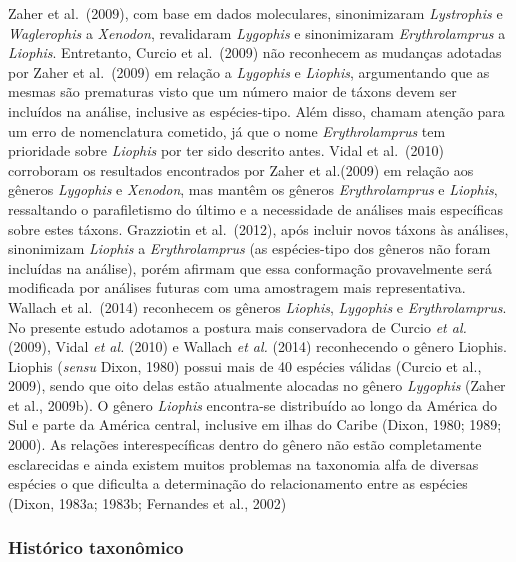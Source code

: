 \documentclass[
]{article}
\begin{document}
Zaher et al.~(2009), com base em dados moleculares, sinonimizaram
\emph{Lystrophis} e \emph{Waglerophis} a \emph{Xenodon}, revalidaram
\emph{Lygophis} e sinonimizaram \emph{Erythrolamprus} a \emph{Liophis}.
Entretanto, Curcio et al.~(2009) não reconhecem as mudanças adotadas por
Zaher et al.~(2009) em relação a \emph{Lygophis} e \emph{Liophis},
argumentando que as mesmas são prematuras visto que um número maior de
táxons devem ser incluídos na análise, inclusive as espécies-tipo. Além
disso, chamam atenção para um erro de nomenclatura cometido, já que o
nome \emph{Erythrolamprus} tem prioridade sobre \emph{Liophis} por ter
sido descrito antes. Vidal et al.~(2010) corroboram os resultados
encontrados por Zaher et al.(2009) em relação aos gêneros
\emph{Lygophis} e \emph{Xenodon}, mas mantêm os gêneros
\emph{Erythrolamprus} e \emph{Liophis}, ressaltando o parafiletismo do
último e a necessidade de análises mais específicas sobre estes táxons.
Grazziotin et al.~(2012), após incluir novos táxons às análises,
sinonimizam \emph{Liophis} a \emph{Erythrolamprus} (as espécies-tipo dos
gêneros não foram incluídas na análise), porém afirmam que essa
conformação provavelmente será modificada por análises futuras com uma
amostragem mais representativa. Wallach et al.~(2014) reconhecem os
gêneros \emph{Liophis}, \emph{Lygophis} e \emph{Erythrolamprus}. No
presente estudo adotamos a postura mais conservadora de Curcio \emph{et
al.} (2009), Vidal \emph{et al.} (2010) e Wallach \emph{et al.} (2014)
reconhecendo o gênero Liophis. Liophis (\emph{sensu} Dixon, 1980) possui
mais de 40 espécies válidas (Curcio et al., 2009), sendo que oito delas
estão atualmente alocadas no gênero \emph{Lygophis} (Zaher et al.,
2009b). O gênero \emph{Liophis} encontra-se distribuído ao longo da
América do Sul e parte da América central, inclusive em ilhas do Caribe
(Dixon, 1980; 1989; 2000). As relações interespecíficas dentro do gênero
não estão completamente esclarecidas e ainda existem muitos problemas na
taxonomia alfa de diversas espécies o que dificulta a determinação do
relacionamento entre as espécies (Dixon, 1983a; 1983b; Fernandes et al.,
2002)

\hypertarget{histuxf3rico-taxonuxf4mico}{%
\subsubsection{Histórico taxonômico}\label{histuxf3rico-taxonuxf4mico}}
\end{document}
